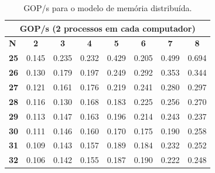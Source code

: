 \documentclass[a4paper]{article}
\begin{document}
\begin{table}[h]
\centering
\begin{tabular}{|l|l|l|l|l|l|l|l|}
\hline
\multicolumn{8}{|c|}{\textbf{GOP/s (2 processos em cada computador)}}                                                                                                                                                                                     \\ \hline
\textbf{N}  & \multicolumn{1}{c|}{\textbf{2}} & \multicolumn{1}{c|}{\textbf{3}} & \multicolumn{1}{c|}{\textbf{4}} & \multicolumn{1}{c|}{\textbf{5}} & \multicolumn{1}{c|}{\textbf{6}} & \multicolumn{1}{c|}{\textbf{7}} & \multicolumn{1}{c|}{\textbf{8}} \\ \hline
\textbf{25} & 0.145                           & 0.235                           & 0.232                           & 0.429                           & 0.205                           & 0.499                           & 0.694                           \\ \hline
\textbf{26} & 0.130                           & 0.179                           & 0.197                           & 0.249                           & 0.292                           & 0.353                           & 0.344                           \\ \hline
\textbf{27} & 0.121                           & 0.161                           & 0.176                           & 0.219                           & 0.241                           & 0.280                           & 0.297                           \\ \hline
\textbf{28} & 0.116                           & 0.130                           & 0.168                           & 0.183                           & 0.225                           & 0.256                           & 0.270                           \\ \hline
\textbf{29} & 0.113                           & 0.147                           & 0.163                           & 0.196                           & 0.214                           & 0.243                           & 0.237                           \\ \hline
\textbf{30} & \multicolumn{1}{c|}{0.111}      & \multicolumn{1}{c|}{0.146}      & \multicolumn{1}{c|}{0.160}      & \multicolumn{1}{c|}{0.170}      & \multicolumn{1}{c|}{0.175}      & \multicolumn{1}{c|}{0.190}      & \multicolumn{1}{c|}{0.258}      \\ \hline
\textbf{31} & 0.109                           & 0.143                           & 0.157                           & 0.189                           & 0.184                           & 0.232                           & 0.252                           \\ \hline
\textbf{32} & 0.106                           & 0.142                           & 0.155                           & 0.187                           & 0.190                           & 0.222                           & 0.248                           \\ \hline
\end{tabular}
\caption{GOP/s para o modelo de memória distribuída.}
\label{tab:2}
\end{table}
\end{document}
